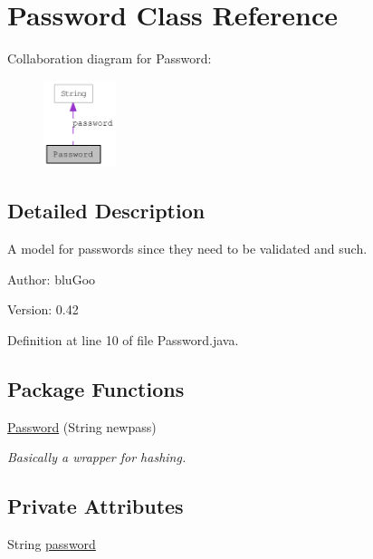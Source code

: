\hypertarget{classPassword}{
\section{Password Class Reference}
\label{classPassword}
}
Collaboration diagram for Password:\nopagebreak
\begin{figure}[H]
\begin{center}
\leavevmode
\includegraphics[width=60pt]{classPassword__coll__graph}
\end{center}
\end{figure}


\subsection{Detailed Description}
A model for passwords since they need to be validated and such. 

\begin{Desc}
\item[Author:]bluGoo \end{Desc}
\begin{Desc}
\item[Version:]0.42 \end{Desc}


Definition at line 10 of file Password.java.\subsection*{Package Functions}
\begin{CompactItemize}
\item 
\hyperlink{classPassword_30315fdcd4e24e1970bf8510cd994efc}{Password} (String newpass)
\begin{CompactList}\small\item\em Basically a wrapper for hashing. \item\end{CompactList}\end{CompactItemize}
\subsection*{Private Attributes}
\begin{CompactItemize}
\item 
String \hyperlink{classPassword_99e20643579188f9248b9ed1b9083bda}{password}
\end{CompactItemize}


